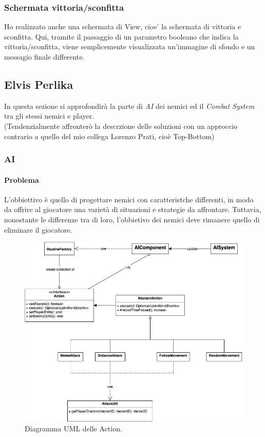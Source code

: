 \documentclass[a4paper,12pt]{report}
\begin{document}
\subsubsection{Schermata vittoria/sconfitta}
Ho realizzato anche una schermata di View, cioe' la schermata di vittoria e sconfitta. Qui, tramite il passaggio di un parametro booleano che indica la vittoria/sconfitta, viene semplicemente visualizzata un'immagine di sfondo e un messagio finale differente.


\subsection{Elvis Perlika}
In questa sezione si approfondirà la parte di \textit{AI} dei nemici
ed il \textit{Combat System} tra gli stessi nemici e player.\\
(Tendenzialmente affronterò la descrzione delle soluzioni con un approccio contrario a quello
del mio collega Lorenzo Prati, cioè Top-Bottom)

\subsubsection{AI}

\paragraph{Problema}
L'obbiettivo è quello di progettare nemici con caratteristche differenti, in modo
da offrire al giocatore una varietà di situazioni e strategie da affrontare.
Tuttavia, nonostante le differenze tra di loro, l'obbietivo dei nemici deve
rimanere quello di eliminare il giocatore.
\begin{figure}[h]
	\centering
	\includegraphics[width=\textwidth]{uml/UML_AI_Image.png}
	\caption{Diagramma UML delle Action.}
	\label{img:badarch}
\end{figure}
\end{document}
